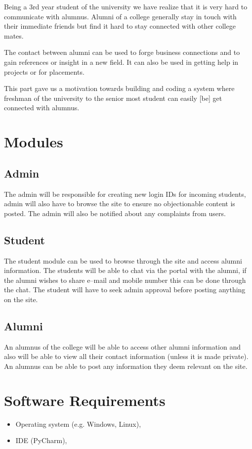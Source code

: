 \documentclass[a4paper]{article}
\begin{document}
Being a 3rd year student of the university we have realize that it is very hard to communicate with alumnus. Alumni of a college generally stay in touch with their immediate friends but find it hard to stay connected with other college mates. 

The contact between alumni can be used to forge business connections and to gain references or insight in a new field. It can also be used in getting help in projects or for placements.

This part gave us a motivation towards building and coding a system where freshman of the university to the senior most student can easily [be] get connected with alumnus.

\section{Modules}
\subsection{Admin}
The admin will be responsible for creating new login IDs for incoming students, admin will also have to browse the site to ensure no objectionable content is posted. The admin will also be notified about any complaints from users.
\subsection{Student}
The student module can be used to browse through the site and access alumni information. The students will be able to chat via the portal with the alumni, if the alumni wishes to share e–mail and mobile number this can be done through the chat. The student will have to seek admin approval before posting anything on the site.
\subsection{Alumni}
An alumnus of the college will be able to access other alumni information and also will be able to view all their contact information (unless it is made private). An alumnus can be able to post any information they deem relevant on the site.

\section{Software Requirements}

\begin{itemize}
\item Operating system (e.g. Windows, Linux),
\item IDE (PyCharm),
\end{itemize}
\end{document}
